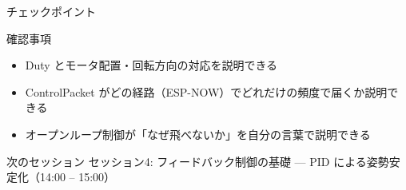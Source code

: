 \begin{frame}{チェックポイント}
  \begin{alertblock}{確認事項}
    \begin{itemize}
      \item[$\square$] Duty とモータ配置・回転方向の対応を説明できる
      \item[$\square$] ControlPacket がどの経路（ESP-NOW）でどれだけの頻度で届くか説明できる
      \item[$\square$] オープンループ制御が「なぜ飛べないか」を自分の言葉で説明できる
    \end{itemize}
  \end{alertblock}

  \vspace{1em}

  \begin{block}{次のセッション}
    セッション4: フィードバック制御の基礎 --- PID による姿勢安定化（14:00 -- 15:00）
  \end{block}
\end{frame}

